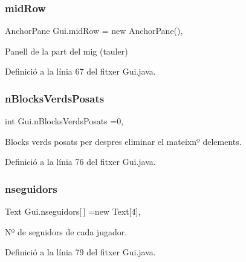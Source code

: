 \subsubsection{\texorpdfstring{mid\+Row}{midRow}}
{\footnotesize\ttfamily Anchor\+Pane Gui.\+mid\+Row = new Anchor\+Pane()\hspace{0.3cm}{\ttfamily [static]}, {\ttfamily [private]}}



Panell de la part del mig (tauler) 



Definició a la línia 67 del fitxer Gui.\+java.

\mbox{\label{class_gui_aadfe303c299579e97ce672d60a7f1cdb}} 
\subsubsection{\texorpdfstring{n\+Blocks\+Verds\+Posats}{nBlocksVerdsPosats}}
{\footnotesize\ttfamily int Gui.\+n\+Blocks\+Verds\+Posats =0\hspace{0.3cm}{\ttfamily [static]}, {\ttfamily [private]}}



Blocks verds posats per despres eliminar el mateixnº d\textquotesingle{}elements. 



Definició a la línia 76 del fitxer Gui.\+java.

\mbox{\label{class_gui_a2ada5459adcc1ecae5c95fbebaebba23}} 
\subsubsection{\texorpdfstring{nseguidors}{nseguidors}}
{\footnotesize\ttfamily Text Gui.\+nseguidors\mbox{[}$\,$\mbox{]} =new Text\mbox{[}4\mbox{]}\hspace{0.3cm}{\ttfamily [static]}, {\ttfamily [private]}}



Nº de seguidors de cada jugador. 



Definició a la línia 79 del fitxer Gui.\+java.

\mbox{\label{class_gui_a3db6ceba3ef9bd93f4133cfe53780a6e}} 
